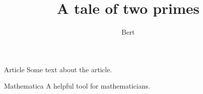 \documentclass{beamer}
\author{Bert}
\title{A tale of two primes}
\begin{document}
\begin{frame}
\titlepage
\end{frame}
\begin{frame}{Article}
Some text about the article.
\end{frame}
\begin{frame}{Mathematica}
A helpful tool for mathematicians.
\end{frame}
\end{document}
